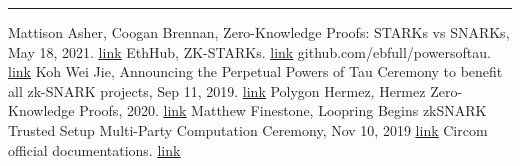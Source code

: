 \documentclass[letterpaper, 10 pt, conference]{ieeeconf}  %
\begin{document}
\noindent\rule{8cm}{0.4pt}
\begin{thebibliography}{99}

 Mattison Asher, Coogan Brennan, Zero-Knowledge Proofs: STARKs vs SNARKs, May 18, 2021. \href{https://consensys.net/blog/blockchain-explained/zero-knowledge-proofs-starks-vs-snarks/}{\underline{link}}
 EthHub, ZK-STARKs. \href{https://docs.ethhub.io/ethereum-roadmap/layer-2-scaling/zk-starks/}{\underline{link}}
 github.com/ebfull/powersoftau. \href{https://github.com/ebfull/powersoftau}{\underline{link}}
 Koh Wei Jie, Announcing the Perpetual Powers of Tau Ceremony to benefit all zk-SNARK projects, Sep 11, 2019. \href{https://medium.com/coinmonks/announcing-the-perpetual-powers-of-tau-ceremony-to-benefit-all-zk-snark-projects-c3da86af8377#:~:text=The%20Powers%20of%20Tau%20ceremony,protocol%20can%20be%20publicly%20verified.&text=Nevertheless%2C%20each%20ceremony%20takes%20time%20and%20is%20tedious%20to%20coordinate.}{\underline{link}}
 Polygon Hermez, Hermez Zero-Knowledge Proofs, 2020. \href{https://blog.hermez.io/hermez-zero-knowledge-proofs/}{\underline{link}}
 Matthew Finestone, Loopring Begins zkSNARK Trusted Setup Multi-Party Computation Ceremony, Nov 10, 2019 \href{https://medium.com/coinmonks/loopring-starts-zksnark-trusted-setup-multi-party-computation-ceremony-cd1b98113773#:~:text=There%20are%20two%20phases%20for,circuit%20in%20the%20Loopring%20protocol.}{\underline{link}}
 Circom official documentations. \href{https://docs.circom.io/circom-language/constraint-generation/}{\underline{link}}
\end{thebibliography}
\end{document}
